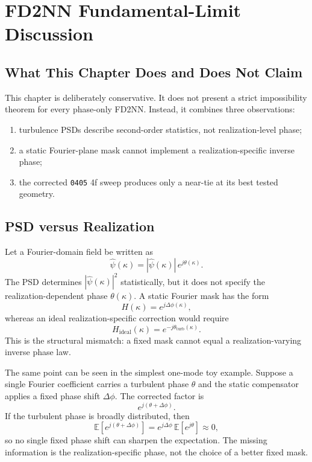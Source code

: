\chapter{FD2NN Fundamental-Limit Discussion}

\section{What This Chapter Does and Does Not Claim}

This chapter is deliberately conservative. It does not present a strict
impossibility theorem for every phase-only FD2NN. Instead, it combines three
observations:
\begin{enumerate}
  \item turbulence PSDs describe second-order statistics, not realization-level
  phase;
  \item a static Fourier-plane mask cannot implement a realization-specific
  inverse phase;
  \item the corrected \texttt{0405} 4f sweep produces only a near-tie at its best
  tested geometry.
\end{enumerate}

\section{PSD versus Realization}

Let a Fourier-domain field be written as
\begin{equation}
\hat{\psi}(\kappa)=|\hat{\psi}(\kappa)|\,e^{j\theta(\kappa)}.
\end{equation}
The PSD determines $|\hat{\psi}(\kappa)|^2$ statistically, but it does not
specify the realization-dependent phase $\theta(\kappa)$. A static Fourier mask
has the form
\begin{equation}
H(\kappa)=e^{j\Delta\phi(\kappa)},
\end{equation}
whereas an ideal realization-specific correction would require
\begin{equation}
H_{\mathrm{ideal}}(\kappa)=e^{-j\theta_{\mathrm{turb}}(\kappa)}.
\end{equation}
This is the structural mismatch: a fixed mask cannot equal a realization-varying
inverse phase law.

The same point can be seen in the simplest one-mode toy example. Suppose a
single Fourier coefficient carries a turbulent phase $\theta$ and the static
compensator applies a fixed phase shift $\Delta \phi$. The corrected factor is
\begin{equation}
e^{j(\theta + \Delta \phi)}.
\end{equation}
If the turbulent phase is broadly distributed, then
\begin{equation}
\mathbb{E}[e^{j(\theta + \Delta \phi)}]
=
e^{j\Delta\phi}\,\mathbb{E}[e^{j\theta}]
\approx 0,
\end{equation}
so no single fixed phase shift can sharpen the expectation. The missing
information is the realization-specific phase, not the choice of a better fixed
mask.

